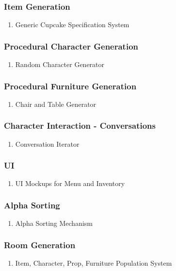 \subsubsection{Item Generation}
\begin{enumerate}
\item Generic Cupcake Specification System
\end{enumerate}
\subsubsection{Procedural Character Generation}
\begin{enumerate}
\item Random Character Generator
\end{enumerate}
\subsubsection{Procedural Furniture Generation}
\begin{enumerate}
\item Chair and Table Generator
\end{enumerate}
\subsubsection{Character Interaction - Conversations}
\begin{enumerate}
\item Conversation Iterator
\end{enumerate}
\subsubsection{UI}
\begin{enumerate}
\item UI Mockups for Menu and Inventory
\end{enumerate}
\subsubsection{Alpha Sorting}
\begin{enumerate}
\item Alpha Sorting Mechanism
\end{enumerate}
\subsubsection{Room Generation}
\begin{enumerate}
\item Item, Character, Prop, Furniture Population System
\end{enumerate}
